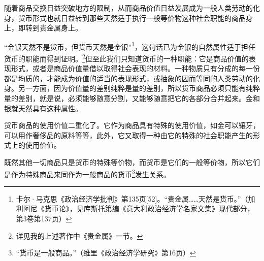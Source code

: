 \documentclass{ctexbook}
\begin{document}
随着商品交换日益突破地方的限制，从而商品价值日益发展成为一般人类劳动的化身，货币形式也就日益转到那些天然适于执行一般等价物这种社会职能的商品身上，即转到贵金属身上。

“金银天然不是货币，但货币天然是金银”\footnote{卡尔·马克思《政治经济学批判》第135页[52]。“贵金属……天然是货币。”（加利阿尼《货币论》，见库斯托第编《意大利政治经济学名家文集》现代部分，第3卷第137页）}，这句话已为金银的自然属性适于担任货币的职能而得到证明。\footnote{详见我的上述著作中《贵金属》一节。}但至此我们只知道货币的一种职能：它是商品价值的表现形式，或者是商品价值量借以取得社会表现的材料。一种物质只有分成的每一份都是均质的，才能成为价值的适当的表现形式，或抽象的因而等同的人类劳动的化身。另一方面，因为价值量的差别纯粹是量的差别，所以货币商品必须只能有纯粹量的差别，就是说，必须能够随意分割，又能够随意把它的各部分合并起来。金和银就天然具有这种属性。

货币商品的使用价值二重化了。它作为商品具有特殊的使用价值，如金可以镶牙，可以用作奢侈品的原料等等，此外，它又取得一种由它的特殊的社会职能产生的形式上的使用价值。

既然其他一切商品只是货币的特殊等价物，而货币是它们的一般等价物，所以它们是作为特殊商品来同作为一般商品的货币\footnote{“货币是一般商品。”（维里《政治经济学研究》第16页）}发生关系。
\end{document}
